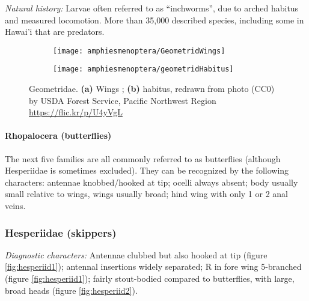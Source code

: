 \noindent{}\textit{Natural history:} Larvae often referred to as ``inchworms'', due to arched habitus and measured locomotion. More than 35,000 described species, including some in Hawai'i that are predators.\vspace{3mm}

\begin{figure}[ht!]
    \centering
    \begin{subfigure}[ht!]{0.26\textwidth}
        \texttt{[image: amphiesmenoptera/GeometridWings]}
        \caption{}
        \label{fig:geometrid1}
    \end{subfigure}
    \hfill
    \begin{subfigure}[ht!]{0.54\textwidth}
        \texttt{[image: amphiesmenoptera/geometridHabitus]}
        \caption{}
        \label{fig:geometrid2}
    \end{subfigure}
    \caption{Geometridae. \textbf{(a)} Wings \citep[][Fig. 20]{comstock1893evolution}; \textbf{(b)} habitus, redrawn from photo (CC0) by USDA Forest Service, Pacific Northwest Region \url{https://flic.kr/p/U4yVgL}}\label{fig:geometrids}
\end{figure}


\FloatBarrier
\paragraph{Rhopalocera (butterflies)} The next five families are all commonly referred to as butterflies (although Hesperiidae is sometimes excluded). They can be recognized by the following characters: antennae knobbed/hooked at tip; ocelli always absent; body usually small relative to wings, wings usually broad; hind wing with only 1 or 2 anal veins.

\subsubsection{Hesperiidae (skippers)}
\noindent{}\textit{Diagnostic characters:} Antennae clubbed but also hooked at tip (figure \ref{fig:hesperiid1}); antennal insertions widely separated; R in fore wing 5-branched (figure \ref{fig:hesperiid1}); fairly stout-bodied compared to butterflies, with large, broad heads (figure \ref{fig:hesperiid2}).\vspace{3mm}

